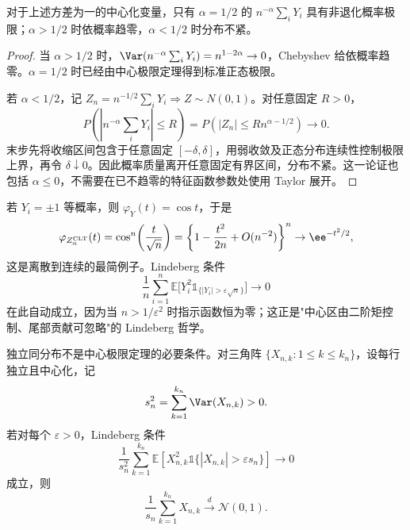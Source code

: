 \begin{proposition}[归一化尺度的非退化性]
对于上述方差为一的中心化变量，只有 $\alpha=1/2$ 的 $n^{-\alpha}\sum_iY_i$ 具有非退化概率极限；$\alpha>1/2$ 时依概率趋零，$\alpha<1/2$ 时分布不紧。
\end{proposition}
\begin{proof}
当 $\alpha>1/2$ 时，$\Var(n^{-\alpha}\sum_iY_i)=n^{1-2\alpha}\to0$，Chebyshev 给依概率趋零。$\alpha=1/2$ 时已经由中心极限定理得到标准正态极限。

若 $\alpha<1/2$，记 $Z_n=n^{-1/2}\sum_iY_i\Rightarrow Z\sim N(0,1)$。对任意固定 $R>0$，
\[
 P\!\left(\left|n^{-\alpha}\sum_iY_i\right|\le R\right)
 =P(|Z_n|\le Rn^{\alpha-1/2})\longrightarrow0.
\]
末步先将收缩区间包含于任意固定 $[-\delta,\delta]$，用弱收敛及正态分布连续性控制极限上界，再令 $\delta\downarrow0$。因此概率质量离开任意固定有界区间，分布不紧。这一论证也包括 $\alpha\le0$，不需要在已不趋零的特征函数参数处使用 Taylor 展开。
\end{proof}

\begin{exbox}[Rademacher 之和]
若 $Y_i=\pm1$ 等概率，则 $\varphi_Y(t)=\cos t$，于是
\[
\varphi_{Z_n^{\rm CLT}}(t)=\cos^n\!\left(\frac{t}{\sqrt n}\right)
=\left\{1-\frac{t^2}{2n}+O(n^{-2})\right\}^n
\to\ee^{-t^2/2},
\]
这是离散到连续的最简例子。Lindeberg 条件
\[
\frac1{n}\sum_{i=1}^n\mathbb E\bigl[Y_i^2\mathds{1}_{\{|Y_i|>\varepsilon\sqrt n\}}\bigr]
\to0
\]
在此自动成立，因为当 $n>1/\varepsilon^2$ 时指示函数恒为零；这正是"中心区由二阶矩控制、尾部贡献可忽略"的 Lindeberg 哲学。

\end{exbox}

\begin{theorem}
独立同分布不是中心极限定理的必要条件。对三角阵 $\{X_{n,k}:1\le k\le k_n\}$，设每行独立且中心化，记
\[
 s_n^2=\sum_{k=1}^{k_n}\Var(X_{n,k})>0.
\]
若对每个 $\varepsilon>0$，Lindeberg 条件
\[
 \frac1{s_n^2}
 \sum_{k=1}^{k_n}
 \mathbb E\!
 \left[X_{n,k}^2\mathds{1}\{|X_{n,k}|>\varepsilon s_n\}\right]
 \to0
\]
成立，则
\[
 \frac1{s_n}\sum_{k=1}^{k_n}X_{n,k}
 \xrightarrow{d}\mathcal N(0,1).
\]
\end{theorem}

